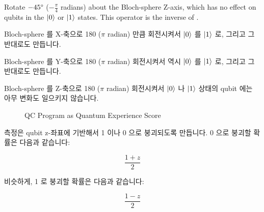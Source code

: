 \begin{description}
	Rotate $-45\degree$ ($-\frac{\pi}{4}$ radians) about the
	Bloch-sphere Z-axis, which has no effect on qubits in the
	$\ket{0}$ or $\ket{1}$ states.
	This operator is the inverse of .
	\fi
\item[\qop{X}\,:]
	Bloch-sphere 를 X-축으로 180\degree{} ($\pi$ radian) 만큼 회전시켜서
	$\ket{0}$ 를 $\ket{1}$ 로, 그리고 그 반대로도 만듭니다.

\item[\qop{Y}\,:]
	Bloch-sphere 를 Y-축으로 180\degree{} ($\pi$ radian) 회전시켜서 역시
	$\ket{0}$ 를 $\ket{1}$ 로, 그리고 그 반대로도 만듭니다.

\item[\qop{Z}\,:]
	Bloch-sphere 를 Z-축으로 180\degree{} ($\pi$ radian) 회전시켜서
	$\ket{0}$ 나 $\ket{1}$ 상태의 qubit 에는 아무 변화도 일으키지 않습니다.

\end{description}

\begin{figure}[tb]
\centering
{}
\caption{QC Program as Quantum Experience Score}
\label{fig:future:QC Program as Quantum Experience Score}
\end{figure}

측정은 qubit z-좌표에 기반해서 1 이나 0 으로 붕괴되도록 만듭니다.
0 으로 붕괴할 확률은 다음과 같습니다:

\begin{equation}
	\frac{1+z}{2}
\end{equation}

비슷하게, 1 로 붕괴할 확률은 다음과 같습니다:

\begin{equation}
	\frac{1-z}{2}
\end{equation}

